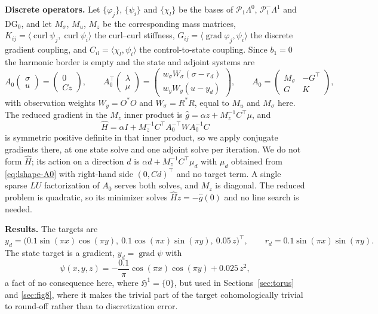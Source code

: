 \documentclass{article}
\DeclareMathOperator{\grad}{grad}
\DeclareMathOperator{\curl}{curl}
\newcommand{\HH}{\mathfrak H}
\newcommand{\ip}[2]{\langle #1,#2\rangle}
\begin{document}
\medskip
\noindent\textbf{Discrete operators.}
Let $\{\varphi_{j}\}$, $\{\psi_{i}\}$ and $\{\chi_{l}\}$ be the bases of
$\mathcal{P}_{1}\Lambda^{0}$, $\mathcal{P}^{-}_{1}\Lambda^{1}$ and
$\mathrm{DG}_{0}$, and let $M_{\sigma}$, $M_{u}$, $M_{z}$ be the corresponding
mass matrices, $K_{ij}=\ip{\curl\psi_{j}}{\curl\psi_{i}}$ the curl--curl
stiffness, $G_{ij}=\ip{\grad\varphi_{j}}{\psi_{i}}$ the discrete gradient
coupling, and $C_{il}=\ip{\chi_{l}}{\psi_{i}}$ the control-to-state coupling.
Since $b_{1}=0$ the harmonic border is empty and the state and adjoint systems
are
\begin{equation}\label{eq:lshape-A0}
  A_{0}\begin{pmatrix}\sigma\\u\end{pmatrix}
  =\begin{pmatrix}0\\Cz\end{pmatrix},
  \qquad
  A_{0}^{\top}\begin{pmatrix}\lambda\\\mu\end{pmatrix}
  =\begin{pmatrix}
     w_{\sigma}W_{\sigma}(\sigma-r_{d})\\
     w_{y}W_{y}(u-y_{d})\end{pmatrix},
  \qquad
  A_{0}=\begin{pmatrix}M_{\sigma}&-G^{\top}\\ G&K\end{pmatrix},
\end{equation}
with observation weights $W_{y}=O^{*}O$ and $W_{\sigma}=R^{*}R$, equal to
$M_{u}$ and $M_{\sigma}$ here. The reduced gradient in the $M_{z}$ inner
product is $\widehat g=\alpha z+M_{z}^{-1}C^{\top}\mu$, and
\[
  \widehat H=\alpha I+M_{z}^{-1}C^{\top}A_{0}^{-\top}WA_{0}^{-1}C
\]
is symmetric positive definite in that inner product, so we apply conjugate
gradients there, at one state solve and one adjoint solve per iteration. We do
not form $\widehat H$; its action on a direction $d$ is
$\alpha d+M_{z}^{-1}C^{\top}\mu_{d}$ with $\mu_{d}$ obtained from
\eqref{eq:lshape-A0} with right-hand side $(0,Cd)^{\top}$ and no target term.
A single sparse $LU$ factorization of $A_{0}$ serves both solves, and $M_{z}$
is diagonal. The reduced problem is quadratic, so its minimizer solves
$\widehat Hz=-\widehat g(0)$ and no line search is needed.

\medskip
\noindent\textbf{Results.}
The targets are
\begin{equation}\label{eq:lshape-targets}
  y_{d}=\bigl(0.1\sin(\pi x)\cos(\pi y),\
              0.1\cos(\pi x)\sin(\pi y),\ 0.05\,z\bigr)^{\top},
  \qquad
  r_{d}=0.1\sin(\pi x)\sin(\pi y).
\end{equation}
The state target is a gradient, $y_{d}=\grad\psi$ with
\begin{equation}\label{eq:psi}
  \psi(x,y,z)=-\frac{0.1}{\pi}\cos(\pi x)\cos(\pi y)+0.025\,z^{2},
\end{equation}
a fact of no consequence here, where $\HH^{1}=\{0\}$, but used in
Sections~\ref{sec:torus} and \ref{sec:fig8}, where it makes the trivial part
of the target cohomologically trivial to round-off rather than to
discretization error.
\end{document}
